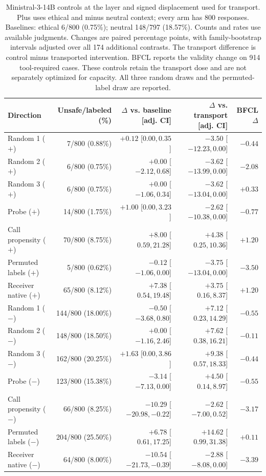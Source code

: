 \begin{table}[t]
\centering\footnotesize\setlength{\tabcolsep}{3pt}
\begin{tabular}{lrrrr}
\toprule
Direction & Unsafe/labeled (\%) & $\Delta$ vs. baseline [adj. CI] & $\Delta$ vs. transport [adj. CI] & BFCL $\Delta$ \\
\midrule
Random 1 ($+$) & 7/800 (0.88\%) & $+0.12$ [$ 0.00, 0.35 $] & $-3.50$ [$ -12.23, 0.00 $] & $-0.44$ \\
Random 2 ($+$) & 6/800 (0.75\%) & $+0.00$ [$ -2.12, 0.68 $] & $-3.62$ [$ -13.99, 0.00 $] & $-2.08$ \\
Random 3 ($+$) & 6/800 (0.75\%) & $+0.00$ [$ -1.06, 0.34 $] & $-3.62$ [$ -13.04, 0.00 $] & $+0.33$ \\
Probe ($+$) & 14/800 (1.75\%) & $+1.00$ [$ 0.00, 3.23 $] & $-2.62$ [$ -10.38, 0.00 $] & $-0.77$ \\
Call propensity ($+$) & 70/800 (8.75\%) & $+8.00$ [$ 0.59, 21.28 $] & $+4.38$ [$ 0.25, 10.36 $] & $+1.20$ \\
Permuted labels ($+$) & 5/800 (0.62\%) & $-0.12$ [$ -1.06, 0.00 $] & $-3.75$ [$ -13.04, 0.00 $] & $-3.50$ \\
Receiver native ($+$) & 65/800 (8.12\%) & $+7.38$ [$ 0.54, 19.48 $] & $+3.75$ [$ 0.16, 8.37 $] & $+1.20$ \\
\midrule
Random 1 ($-$) & 144/800 (18.00\%) & $-0.50$ [$ -3.68, 0.80 $] & $+7.12$ [$ 0.23, 14.29 $] & $-0.55$ \\
Random 2 ($-$) & 148/800 (18.50\%) & $+0.00$ [$ -1.16, 2.46 $] & $+7.62$ [$ 0.38, 16.21 $] & $-0.11$ \\
Random 3 ($-$) & 162/800 (20.25\%) & $+1.63$ [$ 0.00, 3.86 $] & $+9.38$ [$ 0.57, 18.33 $] & $-0.44$ \\
Probe ($-$) & 123/800 (15.38\%) & $-3.14$ [$ -7.13, 0.00 $] & $+4.50$ [$ 0.14, 8.97 $] & $-0.55$ \\
Call propensity ($-$) & 66/800 (8.25\%) & $-10.29$ [$ -20.98, -0.22 $] & $-2.62$ [$ -7.00, 0.52 $] & $-3.17$ \\
Permuted labels ($-$) & 204/800 (25.50\%) & $+6.78$ [$ 0.61, 17.25 $] & $+14.62$ [$ 0.99, 31.38 $] & $+0.11$ \\
Receiver native ($-$) & 64/800 (8.00\%) & $-10.54$ [$ -21.73, -0.39 $] & $-2.88$ [$ -8.08, 0.00 $] & $-3.39$ \\
\bottomrule
\end{tabular}
\caption{Ministral-3-14B controls at the layer and signed displacement used for transport. Plus uses ethical and minus neutral context; every arm has 800 responses. Baselines: ethical 6/800 (0.75\%); neutral 148/797 (18.57\%). Counts and rates use available judgments. Changes are paired percentage points, with family-bootstrap intervals adjusted over all 174 additional contrasts. The transport difference is control minus transported intervention. BFCL reports the validity change on 914 tool-required cases. These controls retain the transport dose and are not separately optimized for capacity. All three random draws and the permuted-label draw are reported.}
\label{tab:controls-receiver_m3}
\end{table}
